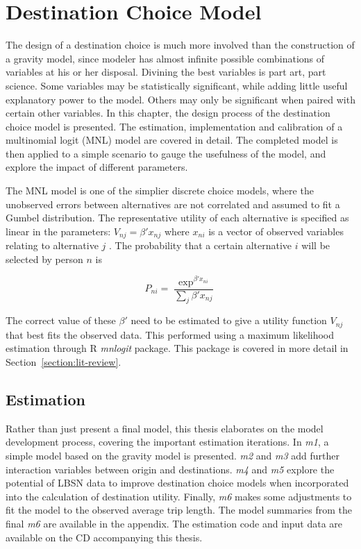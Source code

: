 \chapter{Destination Choice Model}
\label{section:destination-choice}
The design of a destination choice is much more involved than the construction of a gravity model, since modeler has almost infinite possible combinations of variables at his or her disposal. Divining the best variables is part art, part science. Some variables may be statistically significant, while adding little useful explanatory power to the model. Others may only be significant when paired with certain other variables. In this chapter, the design process of the destination choice model is presented. The estimation, implementation and calibration of a multinomial logit (MNL) model are covered in detail. The completed model is then applied to a simple scenario to gauge the usefulness of the model, and explore the impact of different parameters. 

The MNL model is one of the simplier discrete choice models, where the unobserved errors between alternatives are not correlated and assumed to fit a Gumbel distribution. The representative utility of each alternative is specified as linear in the parameters: $V_{nj} = \beta 'x_{nj}$ where $x_{ni}$ is a vector of observed variables relating to alternative $j$ \parencite{Train09}. The probability that a certain alternative $i$ will be selected by person $n$ is 

$$ P_{ni} =  \frac{\exp^{\beta'x_{ni}}}{\sum_j \beta'x_{nj}} $$

The correct value of these $\beta '$ need to be estimated to give a utility function $V_{nj}$ that best fits the observed data. This performed using a maximum likelihood estimation through R \textit{mnlogit} package. This package is covered in more detail in Section~\ref{section:lit-review}. 

\section{Estimation}
\label{section:estimation}
Rather than just present a final model, this thesis elaborates on the model development process, covering the important estimation iterations. In \textit{m1}, a simple model based on the gravity model is presented. \textit{m2} and \textit{m3} add further interaction variables between origin and destinations. \textit{m4} and \textit{m5} explore the potential of LBSN data to improve destination choice models when incorporated into the calculation of destination utility. Finally, \textit{m6} makes some adjustments to fit the model to the observed average trip length. The model summaries from the final \textit{m6} are available in the appendix. The estimation code and input data are available on the CD accompanying this thesis.

